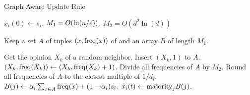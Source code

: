 \begin{algorithm}
  \caption{Graph Aware Update Rule}
  \label{alg:frequencies}
  \begin{algorithmic}[1]
    \STATE $x_i(0) \gets s_i$.
    \STATE $M_1 = O(\ln(n/\varepsilon))$, $M_2 = O(d^2 \ln(d))$

    \STATE Keep a set $A$ of tuples $(x, \mathrm{freq}(x))$
    of and an array $B$ of length $M_1$.


    \STATE Get the opinion $X_k$ of a random neighbor.
    \STATE Insert $(X_k, 1)$ to $A$.
    \ELSE
    \STATE $(X_k, \mathrm{freq}(X_k))
    \gets (X_k,  \mathrm{freq}(X_k) +1) $.
  \ENDIF
\ENDFOR
\STATE Divide all frequencies of $A$ by $M_2$.  \label{alg:line:counters}
\STATE Round all frequencies of $Α$ to the closest multiple of $1/d_i$.
\STATE $B(j) \gets \alpha_i \sum_{x \in A} \mathrm{freq}(x) + (1-\alpha_i) s_i$.
\ENDFOR
\STATE $x_i(t) \gets \mathrm{majority}_j B(j)$.
\ENDFOR
\end{algorithmic}
\end{algorithm}

